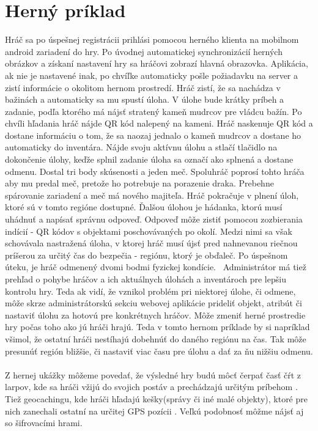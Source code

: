 \section{Herný príklad}
Hráč sa po úspešnej registrácii prihlási pomocou herného klienta na mobilnom android zariadení do hry. Po úvodnej automatickej synchronizácií herných obrázkov a získaní nastavení hry sa hráčovi zobrazí hlavná obrazovka. Aplikácia, ak nie je nastavené inak, po chvíľke automaticky pošle požiadavku na server a zistí informácie o okolitom hernom prostredí. Hráč zistí, že sa nachádza v bažinách a automaticky  sa mu spustí úloha. V úlohe bude krátky príbeh a zadanie, podľa ktorého má nájsť stratený kameň mudrcov pre vládcu bažín. Po chvíli hľadania hráč nájde QR kód nalepený na kameni. Hráč naskenuje QR kód a dostane informáciu o tom, že sa naozaj jednalo o kameň mudrcov a dostane ho automaticky do inventára. Nájde svoju aktívnu úlohu a stlačí tlačidlo na dokončenie úlohy, keďže splnil zadanie úloha sa označí ako splnená a dostane odmenu. Dostal tri body skúsenosti a jeden meč. Spoluhráč poprosí tohto hráča aby mu predal meč, pretože ho potrebuje na porazenie draka. Prebehne spárovanie zariadení a meč má nového majiteľa. Hráč pokračuje v plnení úloh, ktoré sú v tomto regióne dostupné. Ďalšou úlohou je hádanka, ktorú musí uhádnuť a napísať správnu odpoveď. Odpoveď môže zistiť pomocou zozbierania indícií - QR kódov s objektami poschovávaných po okolí. Medzi nimi sa však schovávala nastražená úloha, v ktorej hráč musí újsť pred nahnevanou riečnou príšerou za určitý čas do bezpečia - regiónu, ktorý je obďaleč. Po úspešnom úteku, je hráč odmenený dvomi bodmi fyzickej kondície. \
Administrátor má tiež prehľad o pohybe hráčov a ich aktuálnych úlohách a inventároch pre lepšiu kontrolu hry. Teda ak vidí, že vznikol problém pri niektorej úlohe, či odmene, môže skrze administrátorskú sekciu webovej aplikácie prideliť objekt, atribút či nastaviť úlohu za hotovú pre konkrétnych hráčov. Môže zmeniť herné prostredie hry počas toho ako jú hráči hrajú. Teda v tomto hernom príklade by si napríklad všimol, že ostatní hráči nestíhajú dobehnúť do daného regiónu na čas. Tak môže presunúť región bližšie, či nastaviť viac času pre úlohu a dať za ňu nižšiu odmenu.

\paragraph{}
Z hernej ukážky môžeme povedať, že výsledné hry budú môcť čerpať časť čŕt z larpov, kde sa hráči vžijú do svojich postáv a prechádzajú určitým príbehom \cite{larp-cojeto}. Tiež geocachingu, kde hráči hľadajú kešky(správy či iné malé objekty), ktoré pre nich zanechali ostatní na určitej GPS pozícii \cite{geocaching}. Veľkú podobnosť môžme nájsť aj so šifrovacími hrami. 

